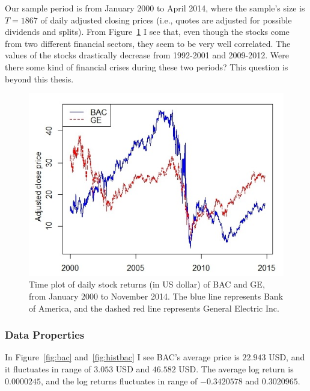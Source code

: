 \documentclass[a4paper,11pt,english]{article}
\begin{document}
			Our sample period is from January 2000 to April 2014, where the sample's size is $T = 1867$ of daily adjusted closing prices (i.e., quotes are 
			adjusted for possible dividends and splits). From Figure~\ref{fig:bacge} I see that, even though the stocks come from two different financial 
			sectors, they seem to be very well correlated. The values of the stocks drastically decrease from 1992-2001 and 2009-2012. Were there some kind 
			of financial crises during these two periods? This question is beyond this thesis.
 		
			\begin{figure}[H]  
				\begin{center}
					\includegraphics[scale=0.7]{BACGE}
					\caption{Time plot of daily stock returns (in US dollar) of BAC and GE, from January 2000 to November 2014. The blue line represents 
					Bank of America, and the dashed red line represents General Electric Inc.}
					\label{fig:bacge}
				\end{center}
			\end{figure}

			\subsubsection{Data Properties}
				
			In Figure~\ref{fig:bac} and~\ref{fig:histbac} I see BAC's average price is $22.943$ USD, and it fluctuates in range of $3.053$ USD and 
			$46.582$ USD. The average log return is $0.0000245$, and the log returns fluctuates in range of $-0.3420578$ and $0.3020965$.
\end{document}
